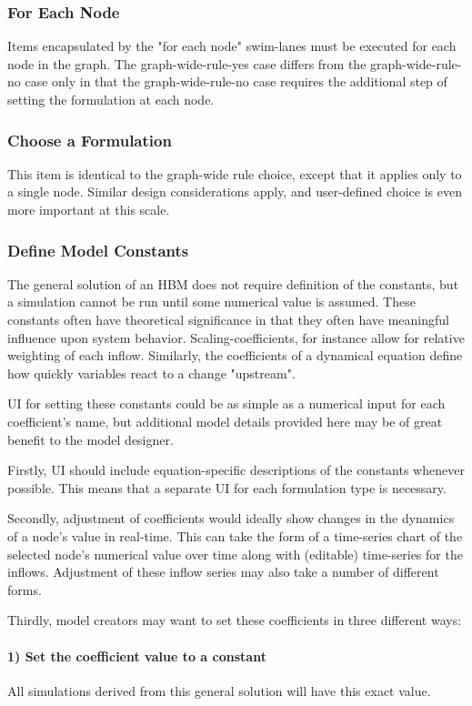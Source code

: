\documentclass[conference]{IEEEtran}
\begin{document}
\subsubsection{For Each Node}

Items encapsulated by the "for each node" swim-lanes must be executed for each node in the graph. 
The graph-wide-rule-yes case differs from the graph-wide-rule-no case only in that the graph-wide-rule-no case requires the additional step of setting the formulation at each node.

\subsubsection{Choose a Formulation}
This item is identical to the graph-wide rule choice, except that it applies only to a single node. Similar design considerations apply, and user-defined choice is even more important at this scale.

\subsubsection{Define Model Constants}
The general solution of an HBM does not require definition of the constants, but a simulation cannot be run until some numerical value is assumed. 
These constants often have theoretical significance in that they often have meaningful influence upon system behavior. 
Scaling-coefficients, for instance allow for relative weighting of each inflow. 
Similarly, the coefficients of a dynamical equation define how quickly variables react to a change "upstream". 

UI for setting these constants could be as simple as a numerical input for each coefficient's name, but additional model details provided here may be of great benefit to the model designer. 

Firstly, UI should include equation-specific descriptions of the constants whenever possible. This means that a separate UI for each formulation type is necessary. 

Secondly, adjustment of coefficients would ideally show changes in the dynamics of a node's value in real-time. 
This can take the form of a time-series chart of the selected node's numerical value over time along with (editable) time-series for the inflows. 
Adjustment of these inflow series may also take a number of different forms. 

Thirdly, model creators may want to set these coefficients in three different ways: 
\paragraph{1) Set the coefficient value to a constant}
All simulations derived from this general solution will have this exact value.
\end{document}
